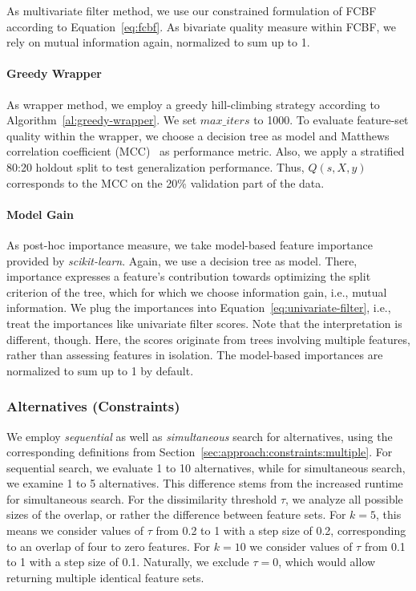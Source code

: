 \documentclass[conference]{IEEEtran}
\theoremstyle{definition}
\begin{document}
As multivariate filter method, we use our constrained formulation of FCBF~\cite{yu2003feature} according to Equation~\ref{eq:fcbf}.
As bivariate quality measure within FCBF, we rely on mutual information again, normalized to sum up to 1.

\paragraph{Greedy Wrapper}

As wrapper method, we employ a greedy hill-climbing strategy according to Algorithm~\ref{al:greedy-wrapper}.
We set $max\_iters$ to 1000.
To evaluate feature-set quality within the wrapper, we choose a decision tree as model and Matthews correlation coefficient (MCC)~\cite{matthews1975comparison} as performance metric.
Also, we apply a stratified 80:20 holdout split to test generalization performance.
Thus, $Q(s,X,y)$ corresponds to the MCC on the 20\% validation part of the data.

\paragraph{Model Gain}

As post-hoc importance measure, we take model-based feature importance provided by \emph{scikit-learn}.
Again, we use a decision tree as model.
There, importance expresses a feature's contribution towards optimizing the split criterion of the tree, which for which we choose information gain, i.e., mutual information.
We plug the importances into Equation~\ref{eq:univariate-filter}, i.e., treat the importances like univariate filter scores.
Note that the interpretation is different, though.
Here, the scores originate from trees involving multiple features, rather than assessing features in isolation.
The model-based importances are normalized to sum up to 1 by default.

\subsubsection{Alternatives (Constraints)}
\label{sec:experimental-design:approaches:alternatives}

We employ \emph{sequential} as well as \emph{simultaneous} search for alternatives, using the corresponding definitions from Section~\ref{sec:approach:constraints:multiple}.
For sequential search, we evaluate 1 to 10 alternatives, while for simultaneous search, we examine 1 to 5 alternatives.
This difference stems from the increased runtime for simultaneous search.
For the dissimilarity threshold $\tau$, we analyze all possible sizes of the overlap, or rather the difference between feature sets.
For $k=5$, this means we consider values of $\tau$ from 0.2 to 1 with a step size of 0.2, corresponding to an overlap of four to zero features.
For $k=10$ we consider values of $\tau$ from 0.1 to 1 with a step size of 0.1.
Naturally, we exclude $\tau = 0$, which would allow returning multiple identical feature sets.
\end{document}
